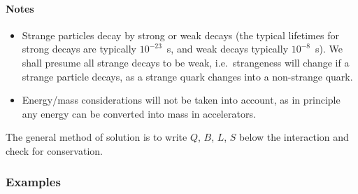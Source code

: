 \documentclass[a4paper,12pt]{article}
\begin{document}
\paragraph{Notes}
\begin{itemize}
\item Strange particles decay by strong or weak decays (the typical lifetimes for strong decays are typically $10^{-23}$~s, and weak decays typically $10^{-8}$~s).  We shall presume all strange decays to be weak, i.e.\ strangeness will change if a strange particle decays, as a strange quark changes into a non-strange quark.
\item Energy/mass considerations will not be taken into account, as in principle any energy can be converted into mass in accelerators.
\end{itemize}

The general method of solution is to write $Q$, $B$, $L$, $S$ below the interaction and check for conservation.

\subsubsection{Examples}
\end{document}
